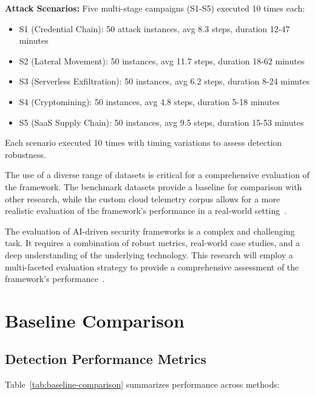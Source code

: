 \textbf{Attack Scenarios:} Five multi-stage campaigns (S1-S5) executed 10 times each:
\begin{itemize}
    \item S1 (Credential Chain): 50 attack instances, avg 8.3 steps, duration 12-47 minutes
    \item S2 (Lateral Movement): 50 instances, avg 11.7 steps, duration 18-62 minutes
    \item S3 (Serverless Exfiltration): 50 instances, avg 6.2 steps, duration 8-24 minutes
    \item S4 (Cryptomining): 50 instances, avg 4.8 steps, duration 5-18 minutes
    \item S5 (SaaS Supply Chain): 50 instances, avg 9.5 steps, duration 15-53 minutes
\end{itemize}

Each scenario executed 10 times with timing variations to assess detection robustness.

The use of a diverse range of datasets is critical for a comprehensive evaluation of the framework. The benchmark datasets provide a baseline for comparison with other research, while the custom cloud telemetry corpus allows for a more realistic evaluation of the framework's performance in a real-world setting~\cite{irejournals2024datasets}.

The evaluation of AI-driven security frameworks is a complex and challenging task. It requires a combination of robust metrics, real-world case studies, and a deep understanding of the underlying technology. This research will employ a multi-faceted evaluation strategy to provide a comprehensive assessment of the framework's performance~\cite{jsaer2024evaluation}.

\section{Baseline Comparison}\label{sec:eval-baseline}
\subsection{Detection Performance Metrics}
Table~\ref{tab:baseline-comparison} summarizes performance across methods:

